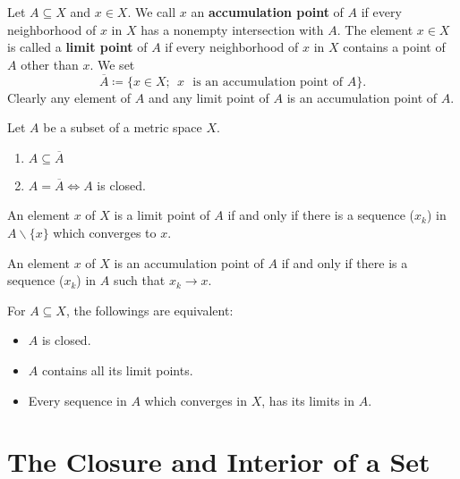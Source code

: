 \begin{definition}
    Let \(A \subseteq X\) and \(x \in X\). We call \(x\) an \textbf{accumulation point}
    of \(A\) if every neighborhood of \(x\) in \(X\) has a nonempty intersection with \(A\). 
    The element \(x \in X\) is called a \textbf{limit point} of \(A\) if every neighborhood
    of \(x\) in \(X\) contains a point of \(A\) other than \(x\). We set 
    \[
        \overline{A} \coloneqq \{ x \in X; \:\: x \:\:\: \text{is an accumulation point of } A \}.   
    \]
    Clearly any element of \(A\) and any limit point of \(A\) is an accumulation point of \(A\). 
\end{definition}

\begin{proposition}
    Let \(A\) be a subset of a metric space \(X\). 
    \begin{enumerate}[label=(\roman*)]
        \item \(A \subseteq \overline{A}\)
        \item \(A = \overline{A} \Leftrightarrow A\) is closed. 
    \end{enumerate}
\end{proposition}

\begin{proposition}
    An element \(x\) of \(X\) is a limit point of \(A\) if and only if there is a sequence 
    (\(x_k\)) in \(A \backslash \{x\}\) which converges to \(x\). 
\end{proposition}

\begin{corollary}
    An element \(x\) of \(X\) is an accumulation point of \(A\) if and only if there is 
    a sequence (\(x_k\)) in \(A\) such that \(x_k \to x\). 
\end{corollary}


\begin{proposition}
    For \(A \subseteq X\), the followings are equivalent:
    \begin{itemize}
        \item \(A\) is closed. 
        \item \(A\) contains all its limit points. 
        \item Every sequence in \(A\) which converges in \(X\), has its limits in \(A\). 
    \end{itemize}
\end{proposition}


\section{The Closure and Interior of a Set}

